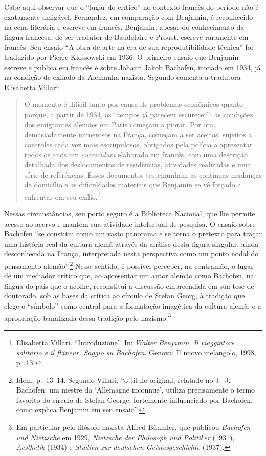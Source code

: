 Cabe aqui observar que o ``lugar do crítico'' no contexto francês do
período não é exatamente amigável. Fernandez, em comparação com
Benjamin, é reconhecido na cena literária e escreve em francês.
Benjamin, apesar do conhecimento da língua francesa, de ser tradutor de
Baudelaire e Proust, escreve raramente em francês. Seu ensaio ``A obra
de arte na era de sua reprodutibilidade técnica'' foi traduzido por
Pierre Klossowski em 1936. O primeiro ensaio que Benjamin escreve e
publica em francês é sobre Johann Jakob Bachofen, iniciado em 1934, já na
condição de exilado da Alemanha nazista. Segundo comenta a tradutora
Elisabetta Villari:

\begin{quote}
O momento é difícil tanto por causa de problemas econômicos quanto
porque, a partir de 1934, os ``tempos já parecem escurecer'': as
condições dos emigrantes alemães em Paris começam a piorar. Por ora,
demasiadamente numerosos na França, começam a ser aceitos: sujeitos a
controles cada vez mais escrupulosos, obrigados pela polícia a
apresentar todos os anos um \emph{curriculum} elaborado em francês, com
uma descrição detalhada dos deslocamentos de residências, atividades
realizadas e uma série de referências. Esses documentos testemunham as
contínuas mudanças de domicílio e as dificuldades materiais que Benjamin
se vê forçado a enfrentar em seu exílio.\footnote{Elisabetta Villari. ``Introduzione''. 
  In: \emph{Walter Benjamin. Il viaggiatore solitário e il flâneur.
  Saggio su Bachofen}. Genova: Il nuovo melangolo, 1998, p.~13.}
\end{quote}

Nessas circunstâncias, seu porto seguro é a Biblioteca Nacional, que lhe
permite acesso ao acervo e mantém sua atividade intelectual de pesquisa.
O ensaio sobre Bachofen ``se constitui como um vasto panorama e se torna
o pretexto para traçar uma história real da cultura alemã através da
análise desta figura singular, ainda desconhecida na França,
interpretada nesta perspectiva como um ponto nodal do pensamento
alemão''.\footnote{Idem, p.~13--14. Segundo Villari, ``o título original,
  relatado no J.~J. Bachofen: um mestre da `Allemagne inconnue', utiliza
  precisamente o termo favorito do círculo de Stefan George, fortemente
  influenciado por Bachofen, como explica Benjamin em seu ensaio''.}
Nesse sentido, é possível perceber, na contramão, o lugar de um mediador
crítico que, ao apresentar um autor alemão como Bachofen, na língua do
país que o acolhe, reconstitui a discussão empreendida em sua tese de
doutorado, sob as bases da crítica ao círculo de Stefan Georg, à
tradição que elege o ``símbolo'' como central para a formatação
imagética da cultura alemã, e a apropriação banalizada dessa tradição
pelo nazismo.\footnote{Em particular pelo filósofo nazista Alfred
  Bäumler, que publicou \emph{Bachofen und Nietzsche} em 1929,
  \emph{Nietzsche der Philosoph und Politiker} (1931), \emph{Aesthetik}
  (1934) e \emph{Studien zur deutschen Geistesgeschichte} (1937).}

